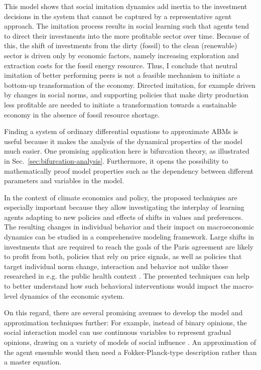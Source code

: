 This model shows that social imitation dynamics add inertia to the investment decisions in the system that cannot be captured by a representative agent approach.
The imitation process results in social learning such that agents tend to direct their investments into the more profitable sector over time.
Because of this, the shift of investments from the dirty (fossil) to the clean (renewable) sector is driven only by economic factors, namely increasing exploration and extraction costs for the fossil energy resource.
Thus, I conclude that neutral imitation of better performing peers is not a feasible mechanism to initiate a bottom-up transformation of the economy. Directed imitation, for example driven by changes in social norms, and supporting policies that make dirty production less profitable are needed to initiate a transformation towards a sustainable economy in the absence of fossil resource shortage.

Finding a system of ordinary differential equations to approximate ABMs is useful because it makes the analysis of the dynamical properties of the model much easier. One promising application here is bifurcation theory, as illustrated in Sec.~\ref{sec:bifurcation-analysis}.
Furthermore, it opens the possibility to mathematically proof model properties such as the dependency between different parameters and variables in the model.

In the context of climate economics and policy, the proposed techniques are especially important because they allow investigating the interplay of learning agents adapting to new policies and effects of shifts in values and preferences. The resulting changes in individual behavior and their impact on macroeconomic dynamics can be studied in a comprehensive modeling framework. 
Large shifts in investments that are required to reach the goals of the Paris agreement are likely to profit from both, policies that rely on price signals, as well as policies that target individual norm change, interaction and behavior not unlike those researched in e.g. the public health context \cite{Zhang2016, Zhang2015, Centola2011}. The presented techniques can help to better understand how such behavioral interventions would impact the macro-level dynamics of the economic system.

On this regard, there are several promising avenues to develop the model and approximation techniques further: For example, instead of binary opinions, the social interaction model can use continuous variables to represent gradual opinions, drawing on a variety of models of social influence \citep[see ref.][pp. 988 f.]{Mueller-Hansen2017}.
An approximation of the agent ensemble would then need a Fokker-Planck-type description rather than a master equation.

